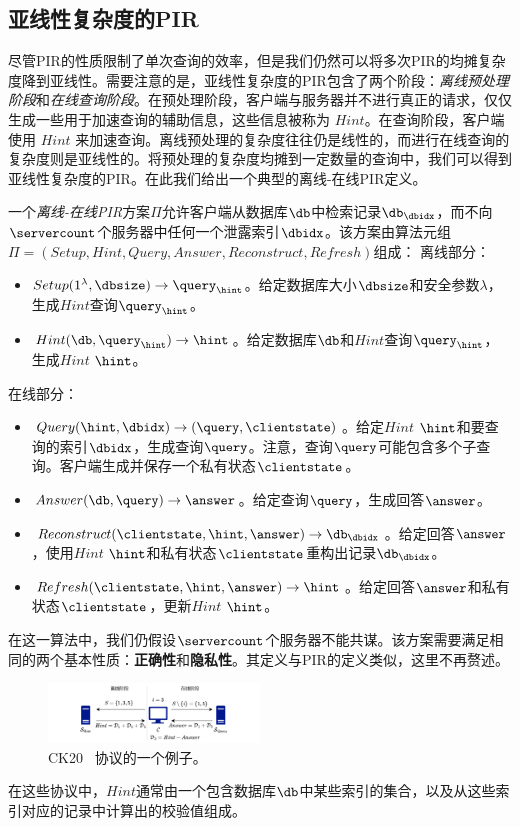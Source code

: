 \subsection{亚线性复杂度的PIR}
尽管PIR的性质限制了单次查询的效率，但是我们仍然可以将多次PIR的均摊复杂度降到亚线性。需要注意的是，亚线性复杂度的PIR包含了两个阶段：\textit{离线预处理阶段}和\textit{在线查询阶段}。在预处理阶段，客户端与服务器并不进行真正的请求，仅仅生成一些用于加速查询的辅助信息，这些信息被称为 $Hint$。在查询阶段，客户端使用 $Hint$ 来加速查询。离线预处理的复杂度往往仍是线性的，而进行在线查询的复杂度则是亚线性的。将预处理的复杂度均摊到一定数量的查询中，我们可以得到亚线性复杂度的PIR。在此我们给出一个典型的离线-在线PIR定义。

\begin{definition}[离线-在线PIR]
    一个\textit{离线-在线PIR}方案$\Pi$允许客户端从数据库$\db$中检索记录$\db_\dbidx$，而不向$\servercount$个服务器中任何一个泄露索引$\dbidx$。该方案由算法元组$\Pi = (Setup, Hint, Query, Answer, Reconstruct, Refresh)$组成：
    离线部分：
    \begin{itemize}[leftmargin=*]
        \item $Setup(1^\lambda,\dbsize) \rightarrow \query_\hint$。给定数据库大小$\dbsize$和安全参数$\lambda$，生成$Hint$查询$\query_\hint$。
        \item $Hint(\db, \query_\hint) \rightarrow \hint$。给定数据库$\db$和$Hint$查询$\query_\hint$，生成$Hint$ $\hint$。
    \end{itemize}
    在线部分：
    \begin{itemize}[leftmargin=*]
        \item $Query(\hint, \dbidx) \rightarrow (\query, \clientstate)$。给定$Hint$ $\hint$和要查询的索引$\dbidx$，生成查询$\query$。注意，查询$\query$可能包含多个子查询。客户端生成并保存一个私有状态$\clientstate$。
        \item $Answer(\db, \query) \rightarrow \answer$。给定查询$\query$，生成回答$\answer$。
        \item $Reconstruct(\clientstate, \hint, \answer) \rightarrow \db_\dbidx$。给定回答$\answer$，使用$Hint$ $\hint$和私有状态$\clientstate$重构出记录$\db_\dbidx$。
        \item $Refresh(\clientstate, \hint, \answer) \rightarrow \hint$。给定回答$\answer$和私有状态$\clientstate$，更新$Hint$ $\hint$。
    \end{itemize}
    在这一算法中，我们仍假设$\servercount$个服务器不能共谋。该方案需要满足相同的两个基本性质：\textbf{正确性}和\textbf{隐私性}。其定义与PIR的定义类似，这里不再赘述。
\end{definition}

\begin{figure}
    \centering
    \includegraphics[width=0.5\textwidth]{figure/ck20.png}
    \caption{CK20~\cite{EC:CorKog20} 协议的一个例子。}
    \label{fig:CK20}
\end{figure}

在这些协议中，$Hint$通常由一个包含数据库$\db$中某些索引的集合，以及从这些索引对应的记录中计算出的校验值组成。
